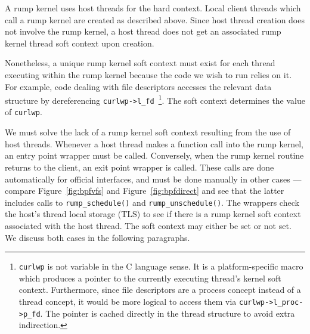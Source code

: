 A rump kernel uses host threads for the hard context.  Local client
threads which call a rump kernel are created as described
above.  Since host thread creation does not involve the rump kernel,
a host thread does not get an associated rump kernel thread soft context
upon creation.

Nonetheless, a unique rump kernel soft context must exist for
each thread executing within the rump kernel because the code we
wish to run relies on it.  For example, code dealing with file
descriptors accesses the relevant data structure by dereferencing
\verb+curlwp->l_fd+~\footnote
{
	\texttt{curlwp} is not variable in the C language sense.
	It is a platform-specific macro which produces a pointer
	to the currently executing thread's kernel soft context.
	Furthermore, since file descriptors are a process concept
	instead of a thread concept, it would be more logical to
	access them via \texttt{curlwp->l\_proc->p\_fd}.
	The pointer is cached directly in
	the thread structure to avoid extra indirection.
}.
The soft context determines the value of \texttt{curlwp}.

We must solve the lack of a rump kernel soft context resulting from the
use of host threads.  Whenever a host thread makes a function call into
the rump kernel, an entry point wrapper must be called.  Conversely,
when the rump kernel routine returns to the client, an exit point wrapper is called.
These calls are done automatically for official interfaces, and must
be done manually in other cases --- compare Figure~\ref{fig:bpfvfs}
and Figure~\ref{fig:bpfdirect} and see that the latter includes calls
to \verb+rump_schedule()+ and \verb+rump_unschedule()+.  The wrappers
check the host's thread local storage (TLS) to see if there is a rump
kernel soft context associated with the host thread.
The soft context may either be set or not set.  We discuss
both cases in the following paragraphs.

